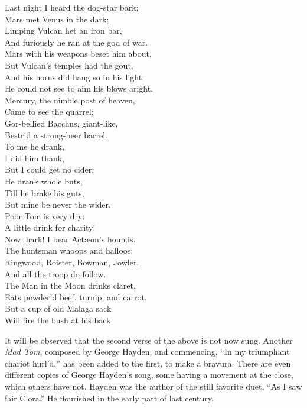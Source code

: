 \settowidth{\versewidth}{Last night I heard the dog-star bark;}
\begin{dcverse}
\begin{patverse}
Last night I heard the dog-star bark;\\
Mars met Venus in the dark;\\
Limping Vulcan het an iron bar,\\
And furiously he ran at the god of war.\\
Mars with his weapons beset him about,\\
But Vulcan’s temples had the gout,\\
And his horns did hang so in his light,\\
He could not see to aim his blows aright.\\
Mercury, the nimble post of heaven,\\
Came to see the quarrel;\\
Gor-bellied Bacchus, giant-like,\\
Bestrid a strong-beer barrel.\\
To me he drank,\\
I did him thank,\\
But I could get no cider;\\
He drank whole buts,\\
Till he brake his guts,\\
But mine be never the wider.\\
Poor Tom is very dry:\\
A little drink for charity!\\
Now, hark! I bear Actæon’s hounds,\\
The huntsman whoops and halloos;\\
Ringwood, Roister, Bowman, Jowler,\\
And all the troop do follow.\\
The Man in the Moon drinks claret,\\
Eats powder’d beef, turnip, and carrot,\\
But a cup of old Malaga sack\\
Will fire the bush at his back.
\end{patverse}
\end{dcverse}

It will be observed that the second verse of the above is not now sung.
Another \textit{Mad Tom}, composed by George Hayden, and commencing, “In my
triumphant chariot hurl’d,” has been added to the first, to make a bravura. There
are even different copies of George Hayden’s song, some having a  movement at
the close, which others have not. Hayden was the author of the still favorite
duet, “As I saw fair Clora.” He flourished in the early part of last century.

